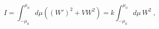 \begin{equation}
I=\int^{\mu_0}_{-\mu_0} d\mu \left((W')^2 +V W^2 \right)
=k\int^{\mu_0}_{-\mu_0} d\mu\, W^2\ ,
\label{integral}
\end{equation}

